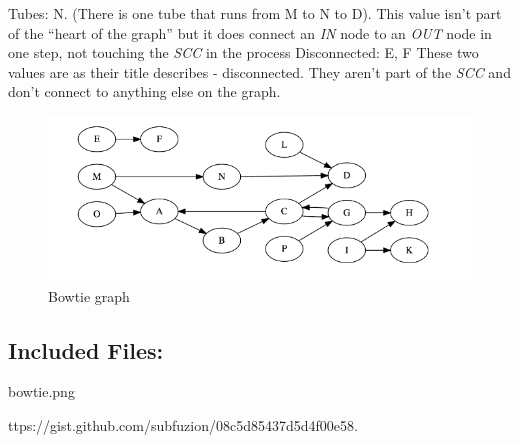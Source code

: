 \documentclass[a4paper, 11pt]{article}
\begin{document}
\noindent
\newline
Tubes: N. (There is one tube that runs from M to N to D).
\newline
This value isn't part of the ``heart of the graph'' but it does connect an \emph{IN} node to an \emph{OUT} node in one step, not touching the \emph{SCC} in the process
\noindent
\newline
Disconnected: E, F
\newline
These two values are as their title describes - disconnected. They aren't part of the \emph{SCC} and don't connect to anything else on the graph.
\begin{figure}[h]
\caption{Bowtie graph}
\centering
\includegraphics[scale=0.5]{bowtie.png}
\end{figure}
\subsection*{Included Files:}
bowtie.png
\begin{thebibliography}{9}
 ttps://gist.github.com/subfuzion/08c5d85437d5d4f00e58.

\end{thebibliography}
\end{document}
